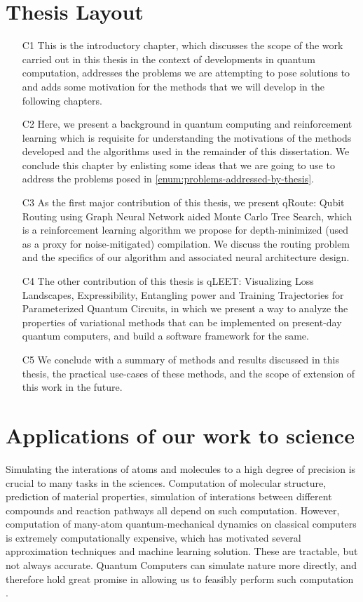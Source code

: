 \section{Thesis Layout}

\begin{itemize}
    \item[C1] This is the introductory chapter, which discusses the scope of the work carried out in this thesis in the context of developments in quantum computation, addresses the problems we are attempting to pose solutions to and adds some motivation for the methods that we will develop in the following chapters.
    \item[C2] Here, we present a background in quantum computing and reinforcement learning which is requisite for understanding the motivations of the methods developed and the algorithms used in the remainder of this dissertation. We conclude this chapter by enlisting some ideas that we are going to use to address the problems posed in \ref{enum:problems-addressed-by-thesis}.
    \item[C3] As the first major contribution of this thesis, we present qRoute: Qubit Routing using Graph Neural Network aided Monte Carlo Tree Search, which is a reinforcement learning algorithm we propose for depth-minimized (used as a proxy for noise-mitigated) compilation. We discuss the routing problem and the specifics of our algorithm and associated neural architecture design.
    \item[C4] The other contribution of this thesis is qLEET: Visualizing Loss Landscapes, Expressibility, Entangling power and Training Trajectories for Parameterized Quantum Circuits, in which we present a way to analyze the properties of variational methods that can be implemented on present-day quantum computers, and build a software framework for the same.
    \item[C5] We conclude with a summary of methods and results discussed in this thesis, the practical use-cases of these methods, and the scope of extension of this work in the future.
\end{itemize}


\section{Applications of our work to science}

Simulating the interations of atoms and molecules to a high degree of precision is crucial to many tasks in the sciences. Computation of molecular structure, prediction of material properties, simulation of interations between different compounds and reaction pathways all depend on such computation. However, computation of many-atom quantum-mechanical dynamics on classical computers is extremely computationally expensive, which has motivated several approximation techniques and machine learning solution. These are tractable, but not always accurate. Quantum Computers can simulate nature more directly, and therefore hold great promise in allowing us to feasibly perform such computation \cite{feynman-quantum-simulating-physics,qpf-simulating-chemistry}.

